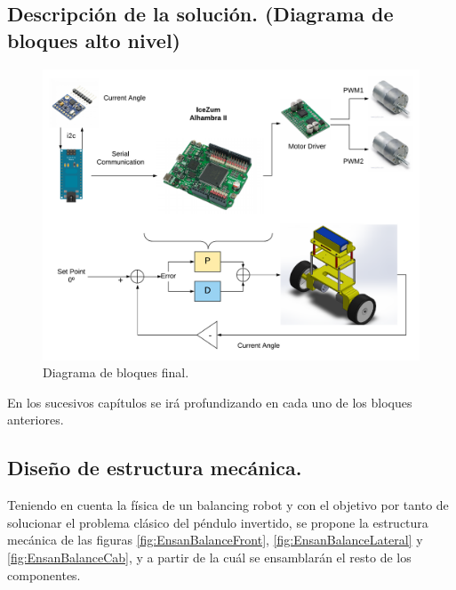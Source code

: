 \subsection{Descripción de la solución. (Diagrama de bloques alto nivel)} \label{sec:descripcion_de_la_solucion}
\begin{center}
	\begin{figure}[H]
		\center
		\includegraphics[trim = 0mm 0mm 0mm 0mm,clip, angle=90, scale = 0.8]{imagenes/Balancing_Robot/final.pdf}
		\caption{Diagrama de bloques final.}
		\label{fig:final}
	\end{figure}
\end{center}
En los sucesivos capítulos se irá profundizando en cada uno de los bloques anteriores. 
\subsection{Diseño de estructura mecánica.}
Teniendo en cuenta la física de un balancing robot y con el objetivo por tanto de solucionar el problema clásico del péndulo invertido, se propone la estructura mecánica de las figuras \ref{fig:EnsanBalanceFront}, \ref{fig:EnsanBalanceLateral} y \ref{fig:EnsanBalanceCab}, y a partir de la cuál se ensamblarán el resto de los componentes.

